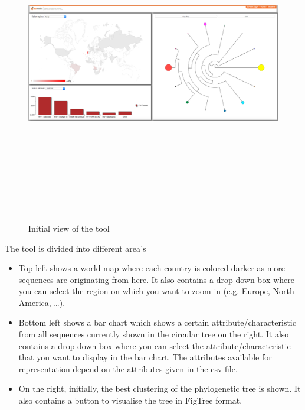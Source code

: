 \documentclass[a4paper, 11pt]{article} %
\begin{document}
\begin{figure}[H]
\centering
\includegraphics[width=400pt, height=400pt, keepaspectratio=true]{images/initial_view.PNG}
\caption{Initial view of the tool}
\label{fig:initial_view}
\end{figure}

The tool is divided into different area's
\begin{itemize}
  \item Top left shows a world map where each country is colored darker as more sequences are originating from here. It also contains a drop down box where you can select the region on which you want to zoom in (e.g. Europe, North-America, \ldots).
  \item Bottom left shows a bar chart which shows a certain attribute/characteristic from all sequences currently shown in the circular tree on the right. It also contains a drop down box where you can select the attribute/characteristic that you want to display in the bar chart. The attributes available for representation depend on the attributes given in the csv file.
  \item On the right, initially, the best clustering of the phylogenetic tree is shown. It also contains a button to visualise the tree in FigTree format.
\end{itemize}
\end{document}
